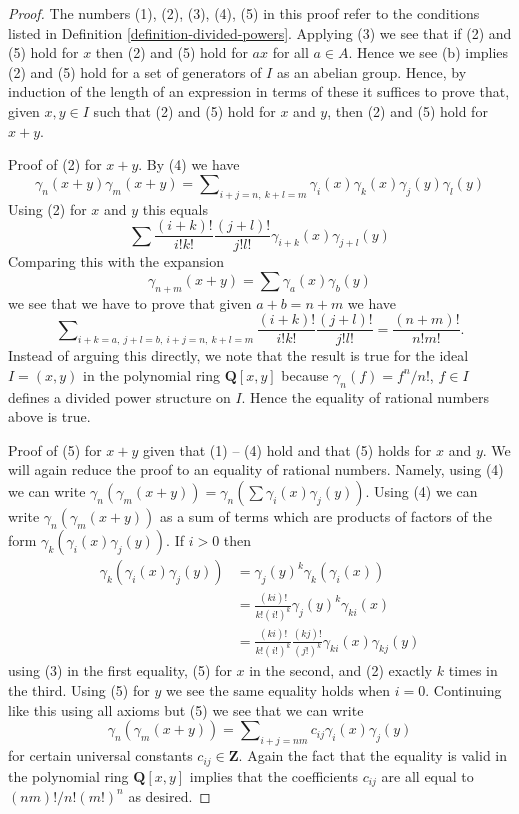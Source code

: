 \begin{proof}
The numbers (1), (2), (3), (4), (5) in this proof refer to the
conditions listed in Definition \ref{definition-divided-powers}.
Applying (3) we see that if (2) and (5) hold for $x$ then (2) and (5)
hold for $ax$ for all $a \in A$. Hence we see (b) implies
(2) and (5) hold for a set of generators
of $I$ as an abelian group. Hence, by induction of the length
of an expression in terms of these it suffices to prove that, given
$x, y \in I$ such that (2) and (5) hold for $x$ and $y$, then (2) and (5) hold
for $x + y$.

\medskip\noindent
Proof of (2) for $x + y$. By (4) we have
$$
\gamma_n(x + y)\gamma_m(x + y) =
\sum\nolimits_{i + j = n,\ k + l = m}
\gamma_i(x)\gamma_k(x)\gamma_j(y)\gamma_l(y)
$$
Using (2) for $x$ and $y$ this equals
$$
\sum \frac{(i + k)!}{i!k!}\frac{(j + l)!}{j!l!}
\gamma_{i + k}(x)\gamma_{j + l}(y)
$$
Comparing this with the expansion
$$
\gamma_{n + m}(x + y) = \sum \gamma_a(x)\gamma_b(y)
$$
we see that we have to prove that given $a + b = n + m$ we have
$$
\sum\nolimits_{i + k = a,\ j + l = b,\ i + j = n,\ k + l = m}
\frac{(i + k)!}{i!k!}\frac{(j + l)!}{j!l!}
=
\frac{(n + m)!}{n!m!}.
$$
Instead of arguing this directly, we note that the result is true
for the ideal $I = (x, y)$ in the polynomial ring $\mathbf{Q}[x, y]$
because $\gamma_n(f) = f^n/n!$, $f \in I$ defines a divided power
structure on $I$. Hence the equality of rational numbers above is true.

\medskip\noindent
Proof of (5) for $x + y$ given that (1) -- (4) hold and that (5)
holds for $x$ and $y$. We will again reduce the proof to an equality
of rational numbers. Namely, using (4) we can write
$\gamma_n(\gamma_m(x + y)) = \gamma_n(\sum \gamma_i(x)\gamma_j(y))$.
Using (4) we can write
$\gamma_n(\gamma_m(x + y))$ as a sum of terms which are products of
factors of the form $\gamma_k(\gamma_i(x)\gamma_j(y))$.
If $i > 0$ then
\begin{align*}
\gamma_k(\gamma_i(x)\gamma_j(y)) & =
\gamma_j(y)^k\gamma_k(\gamma_i(x)) \\
& = \frac{(ki)!}{k!(i!)^k} \gamma_j(y)^k \gamma_{ki}(x) \\
& =
\frac{(ki)!}{k!(i!)^k} \frac{(kj)!}{(j!)^k} \gamma_{ki}(x) \gamma_{kj}(y)
\end{align*}
using (3) in the first equality, (5) for $x$ in the second, and
(2) exactly $k$ times in the third. Using (5) for $y$ we see the
same equality holds when $i = 0$. Continuing like this using all
axioms but (5) we see that we can write
$$
\gamma_n(\gamma_m(x + y)) =
\sum\nolimits_{i + j = nm} c_{ij}\gamma_i(x)\gamma_j(y)
$$
for certain universal constants $c_{ij} \in \mathbf{Z}$. Again the fact
that the equality is valid in the polynomial ring $\mathbf{Q}[x, y]$
implies that the coefficients $c_{ij}$ are all equal to $(nm)!/n!(m!)^n$
as desired.
\end{proof}

